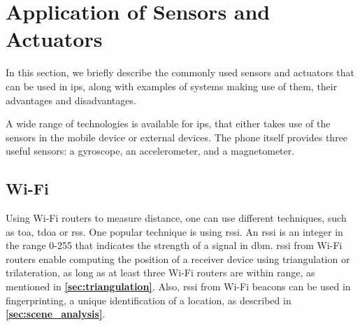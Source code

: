 \section{Application of Sensors and Actuators}\label{sec:actuator_sensor} 

In this section, we briefly describe the commonly used sensors and actuators that can be used in \gls{ips}, along with examples of systems making use of them, their advantages and disadvantages. 

A wide range of technologies is available for \gls{ips}, that either takes use of the sensors in the mobile device or external devices. The phone itself provides three useful sensors: a gyroscope, an accelerometer, and a magnetometer.







\subsection{Wi-Fi} \label{sec:WiFi}
Using Wi-Fi routers to measure distance, one can use different techniques, such as \gls{toa}, \gls{tdoa} or \gls{rss}. One popular technique is using \gls{rssi}. An \gls{rssi} is an integer in the range 0-255 that indicates the strength of a signal in \gls{dbm}.\cite{RSSIWiFiDistance, RSSIMeasurement}
\gls{rssi} from Wi-Fi routers enable computing the position of a receiver device using triangulation or trilateration, as long as at least three Wi-Fi routers are within range, as mentioned in \textbf{\autoref{sec:triangulation}}.
Also, \gls{rssi} from Wi-Fi beacons can be used in fingerprinting, a unique identification of a location, as described in \textbf{\autoref{sec:scene_analysis}}\cite{HabilitationThesis}.

